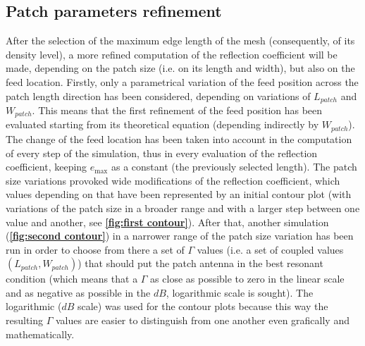 \documentclass[12pt,a4paper]{article}
\begin{document}
{\begin{multicols}{2}
\subsection*{Patch parameters refinement}
After the selection of the maximum edge length of the mesh (consequently, of its density level), a more refined computation of the reflection coefficient will be made, depending on the patch size (i.e. on its length and width), but also on the feed location. Firstly, only a parametrical variation of the feed position across the patch length direction has been considered, depending on variations of $L_{patch}$ and $W_{patch}$. This means that the first refinement of the feed position has been evaluated starting from its theoretical equation (depending indirectly by $W_{patch}$). The change of the feed location has been taken into account in the computation of every step of the simulation, thus in every evaluation of the reflection coefficient, keeping $e_{\max}$ as a constant (the previously selected length). The patch size variations provoked wide modifications of the reflection coefficient, which values depending on that have been represented by an initial contour plot (with variations of the patch size in a broader range and with a larger step between one value and another, see \textbf{\cref{fig:first contour}}). After that, another simulation (\textbf{\cref{fig:second contour}}) in a narrower range of the patch size variation has been run in order to choose from there a set of $\Gamma$ values (i.e. a set of coupled values $(L_{patch},W_{patch})$) that should put the patch antenna in the best resonant condition (which means that a $\Gamma$ as close as possible to zero in the linear scale and as negative as possible in the $dB$, logarithmic scale is sought). The logarithmic ($dB$ scale) was used for the contour plots because this way the resulting $\Gamma$ values are easier to distinguish from one another even grafically and mathematically. 

\end{multicols}}
\end{document}
